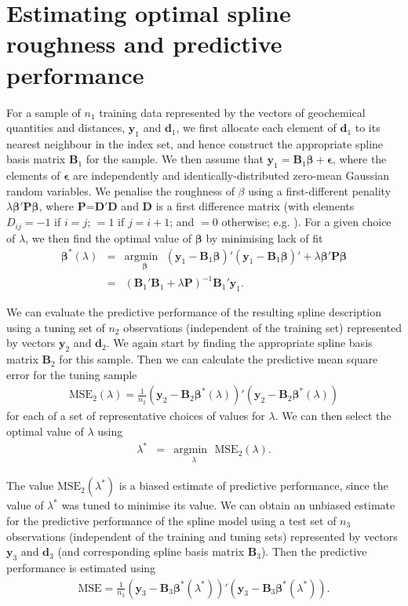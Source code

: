 \documentclass[a4paper,10pt]{article}
\newcommand {\un}[1]{\boldsymbol{#1}}
\newcommand {\argmin}[1]{\underset{#1}{\mathrm{argmin} \text{ }}}
\begin{document}
\section*{Estimating optimal spline roughness and predictive performance}
%
For a sample of $n_1$ training data represented by the vectors of geochemical quantities and distances, $\un{y}_1$ and $\un{d}_1$, we first allocate each element of $\un{d}_1$ to its nearest neighbour in the index set, and hence construct the appropriate spline basis matrix $\un{B}_1$ for the sample. We then assume that $\un{y}_1 = \un{B}_1 \un{\beta} + \un{\epsilon}$, where the elements of $\un{\epsilon}$ are independently and identically-distributed zero-mean Gaussian random variables. We penalise the roughness of $\beta$ using a first-different penality $\lambda \un{\beta}' \un{P} \un{\beta}$, where $\un{P}$=$\un{D}'\un{D}$ and $\un{D}$ is a first difference matrix (with elements $D_{ij}=-1$ if $i=j$; $=1$ if $j=i+1$; and $=0$ otherwise;  e.g. \citealt{JnsEA15}). For a given choice of $\lambda$, we then find the optimal value of $\un{\beta}$ by minimising lack of fit
%
\begin{eqnarray*}
	\un{\beta}^*(\lambda) &=& \argmin{\un{\beta}} (\un{y}_1-\un{B}_1 \un{\beta})'(\un{y}_1-\un{B}_1 \un{\beta})' + \lambda \un{\beta}' \un{P} \un{\beta}\\
	          &=& (\un{B}_1'\un{B}_1+\lambda \un{P})^{-1} \un{B}_1' \un{y}_1 .
\end{eqnarray*}
 
We can evaluate the predictive performance of the resulting spline description using a tuning set of $n_2$ observations (independent of the training set) represented by vectors $\un{y}_2$ and $\un{d}_2$. We again start by finding the appropriate spline basis matrix $\un{B}_2$ for this sample. Then we can calculate the predictive mean square error for the tuning sample
%
\begin{eqnarray*}
	\text{MSE}_2(\lambda) = \frac{1}{n_2}(\un{y}_2-\un{B}_2 \un{\beta}^*(\lambda))'(\un{y}_2-\un{B}_2 \un{\beta}^*(\lambda))
\end{eqnarray*}
%
for each of a set of representative choices of values for $\lambda$. We can then select the optimal value of $\lambda$ using
%
\begin{eqnarray*}
	\lambda^* &=& \argmin{\lambda} \text{MSE}_2(\lambda).
\end{eqnarray*}

The value $\text{MSE}_2(\lambda^*)$ is a biased estimate of predictive performance, since the value of $\lambda^*$ was tuned to minimise its value. We can obtain an unbiased estimate for the predictive performance of the spline model using a test set of $n_3$ observations (independent of the training and tuning sets) represented by vectors $\un{y}_3$ and $\un{d}_3$ (and corresponding spline basis matrix $\un{B}_3$). Then the predictive performance is estimated using 
%
\begin{eqnarray*}
	\text{MSE} = \frac{1}{n_3}(\un{y}_3-\un{B}_3 \un{\beta}^*(\lambda^*))'(\un{y}_3-\un{B}_3 \un{\beta}^*(\lambda^*)).
\end{eqnarray*}
\end{document}
